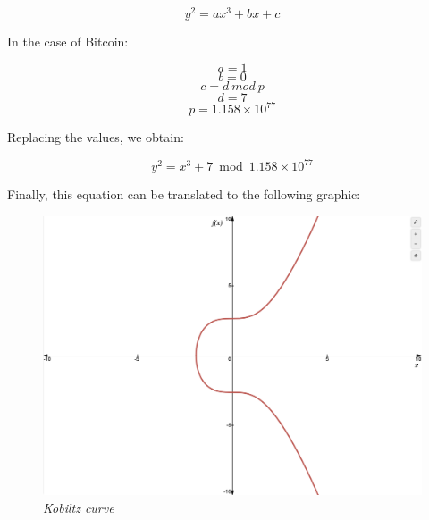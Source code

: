 \documentclass{article}
\begin{document}
\[y^2 = ax^3 + bx + c\]

In the case of Bitcoin:

\[a = 1\]
\[b = 0\]
\[c = d\: mod\: p\]
\[d = 7\]
\[p = 1.158 \times 10^{77}\]

Replacing the values, we obtain:

\[y^2 = x^3 + 7 \bmod{1.158 \times 10^{77}}\]

Finally, this equation can be translated to the following graphic:


\begin{figure}[H]
    \begin{center}
        \includegraphics[width=0.5 \textwidth]{images/Kobiltz_curve.png}
        \caption{\textit{Kobiltz curve}}
    \end{center}
\end{figure}

\end{document}

